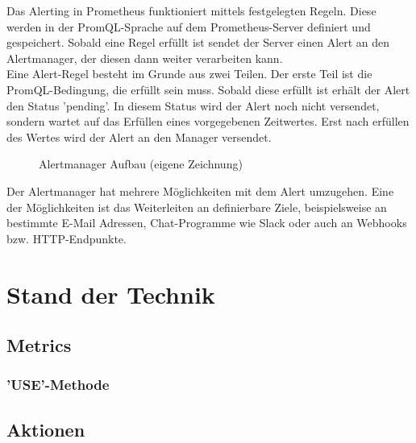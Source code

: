 \documentclass[a4paper,12pt]{scrartcl}
\begin{document}
Das Alerting in Prometheus funktioniert mittels festgelegten Regeln. Diese werden in der PromQL-Sprache auf dem Prometheus-Server definiert und gespeichert. Sobald eine Regel erfüllt ist sendet der Server einen Alert an den Alertmanager, der diesen dann weiter verarbeiten kann.\\
Eine Alert-Regel besteht im Grunde aus zwei Teilen. Der erste Teil ist die PromQL-Bedingung, die erfüllt sein muss. Sobald diese erfüllt ist erhält der Alert den Status 'pending'. In diesem Status wird der Alert noch nicht versendet, sondern wartet auf das Erfüllen eines vorgegebenen Zeitwertes. Erst nach erfüllen des Wertes wird der Alert an den Manager versendet.\\

\begin{figure}[htbp]
  \centering
  \scalebox{.8}{}
  \caption{Alertmanager Aufbau (eigene Zeichnung)}
\end{figure}

Der Alertmanager hat mehrere Möglichkeiten mit dem Alert umzugehen. Eine der Möglichkeiten ist das Weiterleiten an definierbare Ziele, beispielsweise an bestimmte E-Mail Adressen, Chat-Programme wie Slack oder auch an Webhooks bzw. HTTP-Endpunkte.

\pagebreak

\section{Stand der Technik}

\subsection{Metrics}

\subsubsection{'USE'-Methode}

\subsection{Aktionen}
\end{document}
